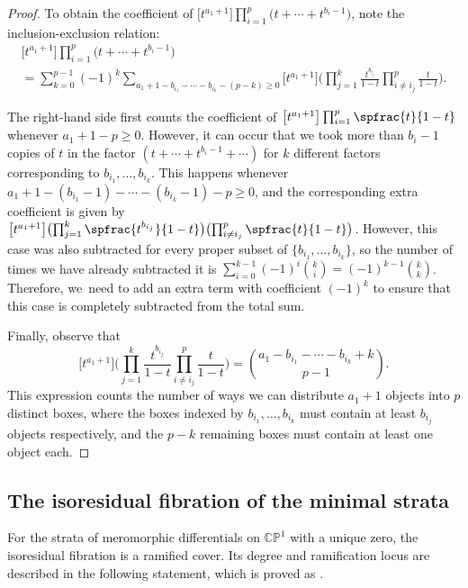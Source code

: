 \begin{proof}
To obtain the coefficient of $\big[t^{a_1+1}\big]\prod_{i=1}^p \big(t + \cdots + t^{b_i-1}\big)$, note the inclusion-exclusion relation:
\begin{multline*}
\big[t^{a_1+1}\big]\prod_{i=1}^p \big(t + \cdots + t^{b_i-1}\big)\\[-10pt]
= \sum_{k=0}^{p-1} (-1)^k \sum_{a_{1}+1-b_{i_1}-\cdots-b_{i_k}-(p-k)\geq 0} \big[t^{a_1+1}\big]\biggl(\prod_{j=1}^k \frac{t^{b_{i_j}}}{1-t}\prod_{i\not= i_j}^p\frac{t}{1-t}\biggr).
\end{multline*}

The right-hand side first counts the coefficient of $\big[t^{a_1+1}\big]\prod_{i=1}^p \spfrac{t}{1-t}$ whenever $a_1+1-p\geq 0$. However, it can occur that we took more than $b_i-1$ copies of $t$ in the factor $(t+\cdots+t^{b_{i}-1}+\cdots)$ for $k$ different factors corresponding to $b_{i_1},\ldots, b_{i_k}$. This happens whenever $a_1+1-(b_{i_1}-1)-\cdots-(b_{i_k}-1)-p\geq 0$, and the corresponding extra coefficient is given by $\big[t^{a_1+1}\big]\bigl(\prod_{j=1}^k \spfrac{t^{b_{i_j}}}{1-t}\bigr)\bigl(\prod_{i\not= i_j}^p\spfrac{t}{1-t}\bigr)$. However, this case was also subtracted for every proper subset of $\{b_{i_1},\ldots, b_{i_k}\}$, so the number of times we have already subtracted it is $\sum_{i=0}^{k-1}(-1)^i\binom{k}{i}=(-1)^{k-1}\binom{k}{k}$. Therefore, we~need to add an extra term with coefficient $(-1)^k$ to ensure that this case is completely subtracted from the total sum.

Finally, observe that
\begin{equation*}\label{eq:Counting}
\big[t^{a_1+1}\big]\biggl(\prod_{j=1}^k \frac{t^{b_{i_j}}}{1-t}\prod_{i\not=i_j}^p\frac{t}{1-t}\biggr) = \binom{a_1-b_{i_1}-\cdots - b_{i_k}+k}{p-1}.
\end{equation*}
This expression counts the number of ways we can distribute $a_1+1$ objects into $p$ distinct boxes, where the boxes indexed by $b_{i_1},\ldots, b_{i_{k}}$ must contain at least $b_{i_j}$ objects respectively, and the $p-k$ remaining boxes must contain at least one object each.
\end{proof}

\subsection{The isoresidual fibration of the minimal strata}\label{sub:Minimal}

For the strata of meromorphic differentials on $\mathbb{CP}^{1}$ with a unique zero, the isoresidual fibration is a ramified cover. Its degree and ramification locus are described in the following statement, which is proved as \cite[Th.\,1.2]{GeTaIso}.

